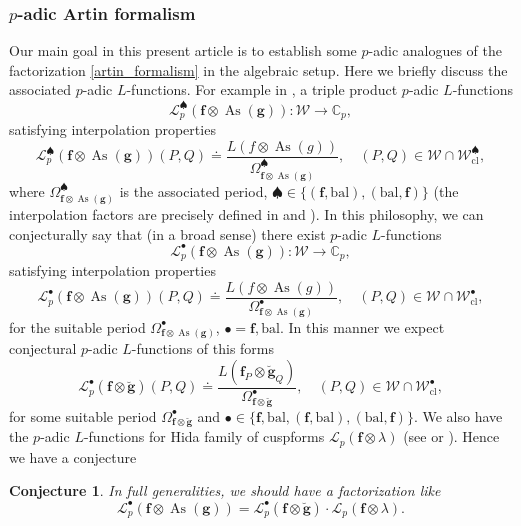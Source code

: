 \documentclass[10pt]{amsart}
\numberwithin{equation}{section}
\newtheorem{conj}{Conjecture}
\theoremstyle{definition}
\theoremstyle{remark} %
\newcommand{\bb}{\mathbb}
\newcommand{\mrm}{\mathrm}
\newcommand{\As}{\operatorname{As}}
\renewcommand{\b}{\mathrm{bal}}
\newcommand{\f}{\mathbf{f}}
\newcommand{\g}{\mathbf{g}}
\newcommand{\W}{\mathcal{W}}
\begin{document}
	\subsubsection{$ p $-adic Artin formalism}
	Our main goal in this present article is to establish some $ p $-adic analogues of the factorization \eqref{artin_formalism} in the algebraic setup. Here we briefly discuss the associated $ p $-adic $  L$-functions. 
	For example in \cite[Theorem 1.2]{salazar2019tripleproductpadiclfunctions}, a triple product $ p $-adic $ L $-functions
	$$\mathscr{L}_p^{\spadesuit}(\f \otimes \As(\g)) \colon \W \rightarrow \bb{C}_p ,$$
	satisfying interpolation properties
	\begin{equation}
		\mathscr{L}_p^{\spadesuit}(\f \otimes \As(\g))(P,Q)\doteq\dfrac{L(f \otimes \As(g))}{\Omega^{\spadesuit}_{\f \otimes \As(\g)}}, \quad (P,Q) \in \W \cap \W_{\mrm{cl}}^{\spadesuit},
	\end{equation} 
	where $ \Omega^{\spadesuit}_{\f \otimes \As(\g)} $ is the associated period, $ \spadesuit \in \{(\f,\b),(\b,\f)\} $ (the interpolation factors are precisely defined in \cite{salazar2019tripleproductpadiclfunctions} and \cite{Molina21}). In this philosophy, we can conjecturally say that (in a broad sense) there exist $ p $-adic $ L $-functions
	$$\mathscr{L}_p^{\bullet}(\f \otimes \As(\g)) \colon \W \rightarrow \bb{C}_p ,$$
	satisfying interpolation properties
	\begin{equation}
		\mathscr{L}_p^{\bullet}(\f \otimes \As(\g))(P,Q)\doteq\dfrac{L(f \otimes \As(g))}{\Omega^{\bullet}_{\f \otimes \As(\g)}}, \quad (P,Q) \in \W \cap \W_{\mrm{cl}}^{\bullet},
	\end{equation} 
	for the suitable period $ \Omega^{\bullet}_{\f \otimes \As(\g)} $, $ \bullet = \f, \b $. In this manner we expect conjectural $ p $-adic $ L $-functions of this forms
	\begin{equation}
		\mathscr{L}_p^{\bullet}(\f \otimes\breve{\g})(P,Q) \doteq \dfrac{L(\f_P \otimes \breve{\g}_Q)}{\Omega^{\bullet}_{\f \otimes \breve{\g}}}, \quad  (P,Q) \in \W \cap \W_{\mrm{cl}}^{\bullet},
	\end{equation}
	for some suitable period $ \Omega^{\bullet}_{\f \otimes \breve{\g}} $ and $ \bullet \in \{\f,\b, (\f,\b), (\b,\f) \} $. We also have the $ p $-adic $ L $-functions for Hida family of cuspforms $ \mathscr{L}_p(\f \otimes \lambda) $ (see \cite[Theorem 0.1]{Dimitrov13} or \cite[]{bergdall2021padiclfunctionshilbertmodular}). Hence we have a conjecture
	\begin{conj} 
		In full generalities, we should have a factorization like
		$$\mathscr{L}_p^{\bullet}(\f \otimes \As(\g)) = \mathscr{L}_p^{\bullet}(\f \otimes\breve{\g})\cdot\mathscr{L}_p(\f \otimes \lambda).$$	
	\end{conj}
\end{document}
